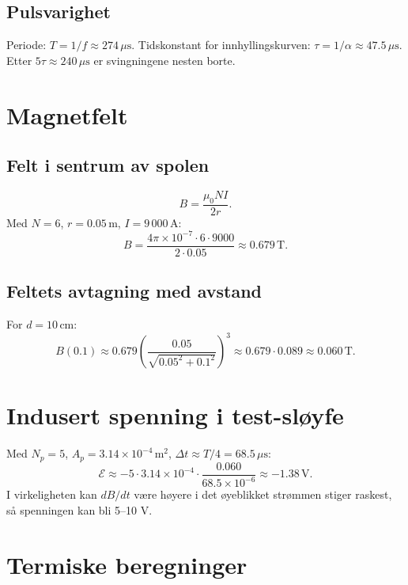 \documentclass{article}
\begin{document}
\subsection{Pulsvarighet}
Periode: $T = 1/f \approx 274\,\mu\text{s}$. Tidskonstant for innhyllingskurven: $\tau = 1/\alpha \approx 47.5\,\mu\text{s}$. Etter $5\tau \approx 240\,\mu\text{s}$ er svingningene nesten borte.

\section{Magnetfelt}

\subsection{Felt i sentrum av spolen}
\begin{equation}
B = \frac{\mu_0 N I}{2 r}.
\end{equation}
Med $N=6$, $r=0.05\,\text{m}$, $I=9\,000\,\text{A}$:
\begin{equation}
B = \frac{4\pi \times 10^{-7} \cdot 6 \cdot 9000}{2 \cdot 0.05} \approx 0.679\,\text{T}.
\end{equation}

\subsection{Feltets avtagning med avstand}
For $d = 10\,\text{cm}$:
\begin{equation}
B(0.1) \approx 0.679 \left( \frac{0.05}{\sqrt{0.05^2 + 0.1^2}} \right)^3 \approx 0.679 \cdot 0.089 \approx 0.060\,\text{T}.
\end{equation}

\section{Indusert spenning i test-sløyfe}
Med $N_p=5$, $A_p=3.14\times10^{-4}\,\text{m}^2$, $\Delta t \approx T/4 = 68.5\,\mu\text{s}$:
\begin{equation}
\mathcal{E} \approx -5 \cdot 3.14\times10^{-4} \cdot \frac{0.060}{68.5\times10^{-6}} \approx -1.38\,\text{V}.
\end{equation}
I virkeligheten kan $dB/dt$ være høyere i det øyeblikket strømmen stiger raskest, så spenningen kan bli 5–10 V.

\section{Termiske beregninger}
\end{document}
